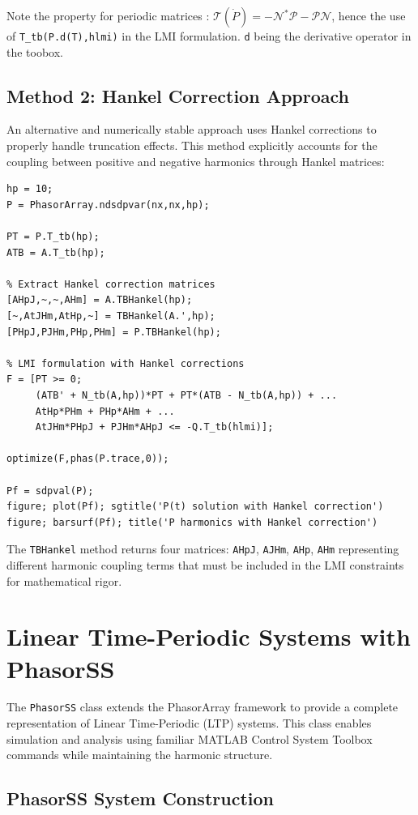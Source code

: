 \documentclass[11pt,a4paper]{article}
\begin{document}
Note the property for periodic matrices : $\mathcal{T}(\dot P) = \mathcal{-N^* P - P N}$, hence the use of \texttt{T\_tb(P.d(T),hlmi)} in the LMI formulation. \texttt{d} being the derivative operator in the toobox.

\subsection{Method 2: Hankel Correction Approach}

An alternative and numerically stable approach uses Hankel corrections to properly handle truncation effects. This method explicitly accounts for the coupling between positive and negative harmonics through Hankel matrices:

\begin{lstlisting}[style=matlabstyle]
hp = 10;
P = PhasorArray.ndsdpvar(nx,nx,hp);

PT = P.T_tb(hp);
ATB = A.T_tb(hp);

% Extract Hankel correction matrices
[AHpJ,~,~,AHm] = A.TBHankel(hp);
[~,AtJHm,AtHp,~] = TBHankel(A.',hp);
[PHpJ,PJHm,PHp,PHm] = P.TBHankel(hp);

% LMI formulation with Hankel corrections
F = [PT >= 0; 
     (ATB' + N_tb(A,hp))*PT + PT*(ATB - N_tb(A,hp)) + ...
     AtHp*PHm + PHp*AHm + ...
     AtJHm*PHpJ + PJHm*AHpJ <= -Q.T_tb(hlmi)];
     
optimize(F,phas(P.trace,0));

Pf = sdpval(P);
figure; plot(Pf); sgtitle('P(t) solution with Hankel correction')
figure; barsurf(Pf); title('P harmonics with Hankel correction')
\end{lstlisting}

The \texttt{TBHankel} method returns four matrices: \texttt{AHpJ}, \texttt{AJHm}, \texttt{AHp}, \texttt{AHm} representing different harmonic coupling terms that must be included in the LMI constraints for mathematical rigor.

\section{Linear Time-Periodic Systems with PhasorSS}

The \texttt{PhasorSS} class extends the PhasorArray framework to provide a complete representation of Linear Time-Periodic (LTP) systems. This class enables simulation and analysis using familiar MATLAB Control System Toolbox commands while maintaining the harmonic structure.

\subsection{PhasorSS System Construction}
\end{document}
